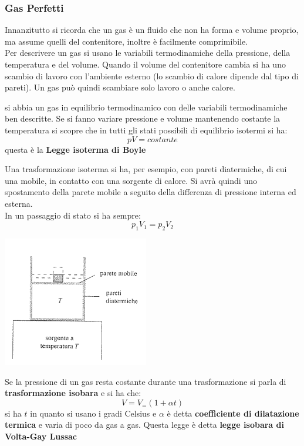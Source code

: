 \documentclass[a4paper,12pt, oneside]{book}
\begin{document}
\subsubsection{Gas Perfetti}
Innanzitutto si ricorda che un gas è un fluido che non ha forma e volume proprio, ma assume quelli del contenitore, inoltre è facilmente comprimibile. \\
Per descrivere un gas si usano le variabili termodinamiche della pressione, della temperatura e del volume. Quando il volume del contenitore cambia si ha uno scambio di lavoro con l'ambiente esterno (lo scambio di calore dipende dal tipo di pareti). Un gas può quindi scambiare solo lavoro o anche calore.\\
\begin{definizione}
	si abbia un gas in equilibrio termodinamico con delle variabili termodinamiche ben descritte. Se si fanno variare pressione e volume mantenendo costante la temperatura si scopre che in tutti gli stati possibili di equilibrio isotermi si ha:
	$$pV=costante$$
	questa è la \textbf{Legge isoterma di Boyle}
\end{definizione}
Una trasformazione isoterma si ha, per esempio, con pareti diatermiche, di cui una mobile, in contatto con una sorgente di calore. Si avrà quindi uno spostamento della parete mobile a seguito della differenza di pressione interna ed esterna.\\
In un passaggio di stato si ha sempre:
$$p_1V_1=p_2V_2$$
\begin{center}
	\includegraphics[scale=0.5]{img/term2.png}
\end{center}
Se la pressione di un gas resta costante durante una trasformazione si parla di \textbf{trasformazione isobara} e si ha che:
$$V=V_=(1+\alpha t)$$
si ha $t$ in quanto si usano i gradi Celsius e $\alpha$ è detta \textbf{coefficiente di dilatazione termica} e varia di poco da gas a gas. Questa legge è detta \textbf{legge isobara di Volta-Gay Lussac}\\
\end{document}
